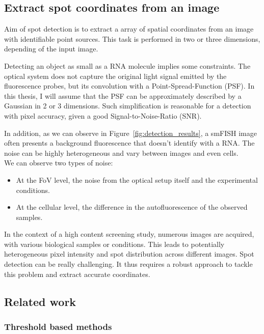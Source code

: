 \subsection{Extract spot coordinates from an image}
\label{subsec:detection}

Aim of spot detection is to extract a array of spatial coordinates from an image with identifiable point sources.
This task is performed in two or three dimensions, depending of the input image.

Detecting an object as small as a \ac{RNA} molecule implies some constraints.
The optical system does not capture the original light signal emitted by the fluorescence probes, but its convolution with a Point-Spread-Function (\ac{PSF}).
In this thesis, I will assume that the \ac{PSF} can be approximately described by a Gaussian in 2 or 3 dimensions. 
Such simplification is reasonable for a detection with pixel accuracy, given a good Signal-to-Noise-Ratio (\ac{SNR}).

In addition, as we can observe in Figure~\ref{fig:detection_results}, a \ac{smFISH} image often presents a background fluorescence that doesn't identify with a \ac{RNA}.
The noise can be highly heterogeneous and vary between images and even cells.\\
\noindent
We can observe two types of noise:
\begin{itemize}
	\setlength\itemsep{0.1em}
	\item At the \ac{FoV} level, the noise from the optical setup itself and the experimental conditions.
	\item At the cellular level, the difference in the autofluorescence of the observed samples.
\end{itemize}

In the context of a high content screening study, numerous images are acquired, with various biological samples or conditions.
This leads to potentially heterogeneous pixel intensity and spot distribution across different images.
Spot detection can be really challenging.
It thus requires a robust approach to tackle this problem and extract accurate coordinates.

\subsection{Related work}
\label{subsec:detection_related_work}

\subsubsection{Threshold based methods}

